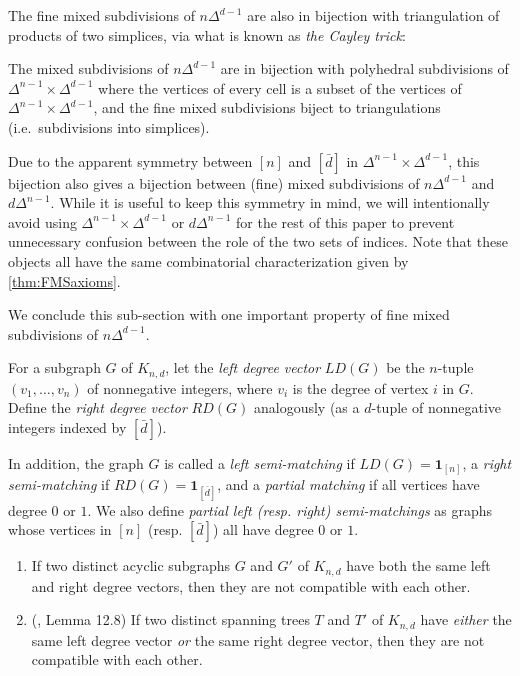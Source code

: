 \documentclass[letterpaper,reqno,11pt]{amsart}
\begin{document}
The fine mixed subdivisions of $n\Delta^{d-1}$ are also in bijection with triangulation of products of two simplices, via what is known as \emph{the Cayley trick}:

\begin{theorem}
    The mixed subdivisions of $n\Delta^{d-1}$ are in bijection with polyhedral subdivisions of $\Delta^{n-1} \times \Delta^{d-1}$ where the vertices of every cell is a subset of the vertices of $\Delta^{n-1} \times \Delta^{d-1}$, and the fine mixed subdivisions biject to triangulations (i.e.\ subdivisions into simplices).
\end{theorem}

\begin{remark}
    Due to the apparent symmetry between $[n]$ and $[\bar{d}]$ in $\Delta^{n-1} \times \Delta^{d-1}$, this bijection also gives a bijection between (fine) mixed subdivisions of $n\Delta^{d-1}$ and $d\Delta^{n-1}$. While it is useful to keep this symmetry in mind, we will intentionally avoid using $\Delta^{n-1} \times \Delta^{d-1}$ or $d\Delta^{n-1}$ for the rest of this paper to prevent unnecessary confusion between the role of the two sets of indices. Note that these objects all have the same combinatorial characterization given by \cref{thm:FMSaxioms}.
\end{remark}

We conclude this sub-section with one important property of fine mixed subdivisions of $n\Delta^{d-1}$.

\begin{definition}
    For a subgraph $G$ of $K_{n, d}$, let the \emph{left degree vector} $LD(G)$ be the $n$-tuple $(v_1, \dots, v_n)$ of nonnegative integers, where $v_i$ is the degree of vertex $i$ in $G$. Define the \emph{right degree vector} $RD(G)$ analogously (as a $d$-tuple of nonnegative integers indexed by $[\bar{d}]$).

    In addition, the graph $G$ is called a \emph{left semi-matching} if $LD(G) = \mathbf{1}_{[n]}$, a \emph{right semi-matching} if $RD(G) = \mathbf{1}_{[\bar{d}]}$, and a \emph{partial matching} if all vertices have degree $0$ or $1$. We also define \emph{partial left (resp. right) semi-matchings} as graphs whose vertices in $[n]$ (resp. $[\bar{d}]$) all have degree $0$ or $1$.
\end{definition}

\begin{lemma}\label{lem:compat}
    \begin{enumerate}
        \item[(a)] If two distinct acyclic subgraphs $G$ and $G'$ of $K_{n,d}$ have both the same left and right degree vectors, then they are not compatible with each other.
        \item[(b)] \textnormal{(\cite{Permutohedra}, Lemma 12.8)} If two distinct spanning trees $T$ and $T'$ of $K_{n,d}$ have \emph{either} the same left degree vector \emph{or} the same right degree vector, then they are not compatible with each other.
    \end{enumerate}
\end{lemma}
\end{document}
